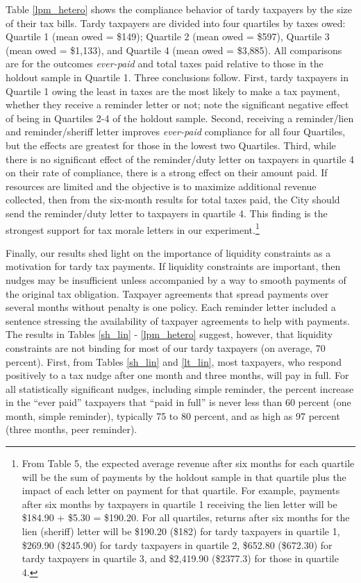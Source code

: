 \documentclass[12pt]{article}
\begin{document}
Table \ref{lpm_hetero} shows the compliance behavior of tardy
taxpayers by the size of their tax bills.  Tardy taxpayers are divided
into four quartiles by taxes owed: Quartile 1 (mean owed = \$149);
Quartile 2 (mean owed = \$597), Quartile 3 (mean owed = \$1,133), and
Quartile 4 (mean owed = \$3,885).  All comparisons are for the
outcomes \textit{ever-paid} and total taxes paid relative to those
in the holdout sample in Quartile 1.  Three conclusions follow.
First, tardy taxpayers in Quartile 1 owing the least in taxes are the
most likely to make a tax payment, whether they receive a reminder
letter or not; note the significant negative effect of being in
Quartiles 2-4 of the holdout sample.  Second, receiving a
reminder/lien and reminder/sheriff letter improves \textit{ever-paid}
compliance for all four Quartiles, but the effects are greatest for
those in the lowest two Quartiles.  Third, while there is no
significant effect of the reminder/duty letter on taxpayers in
quartile 4 on their rate of compliance, there is a strong effect on
their amount paid.  If resources are limited and the objective is to
maximize additional revenue collected, then from the six-month results
for total taxes paid, the City should send the reminder/duty letter to
taxpayers in quartile 4. This finding is the strongest support for tax
morale letters in our experiment.\footnote{From Table 5, the expected
  average revenue after six months for each quartile will be the sum
  of payments by the holdout sample in that quartile plus the impact
  of each letter on payment for that quartile.  For example, payments
  after six months by taxpayers in quartile 1 receiving the lien
  letter will be \$184.90 + \$5.30 = \$190.20.  For all quartiles,
  returns after six months for the lien (sheriff) letter will be
  \$190.20 (\$182) for tardy taxpayers in quartile 1, \$269.90
  (\$245.90) for tardy taxpayers in quartile 2, \$652.80 (\$672.30)
  for tardy taxpayers in quartile 3, and \$2,419.90 (\$2377.3) for
  those in quartile 4.}

Finally, our results shed light on the importance of liquidity
constraints as a motivation for tardy tax payments. If liquidity
constraints are important, then nudges may be insufficient unless
accompanied by a way to smooth payments of the original tax
obligation. Taxpayer agreements that spread payments over several
months without penalty is one policy. Each reminder letter included a
sentence stressing the availability of taxpayer agreements to help
with payments. The results in Tables \ref{sh_lin} - \ref{lpm_hetero}
suggest, however, that liquidity constraints are not binding for most
of our tardy taxpayers (on average, 70 percent). First, from Tables
\ref{sh_lin} and \ref{lt_lin}, most taxpayers, who respond positively
to a tax nudge after one month and three months, will pay in full.
For all statistically significant nudges,
including simple reminder, the percent increase in the ``ever paid''
taxpayers that ``paid in full'' is never less than 60 percent (one
month, simple reminder), typically 75 to 80 percent, and as high as 97
percent (three months, peer reminder).
\end{document}
